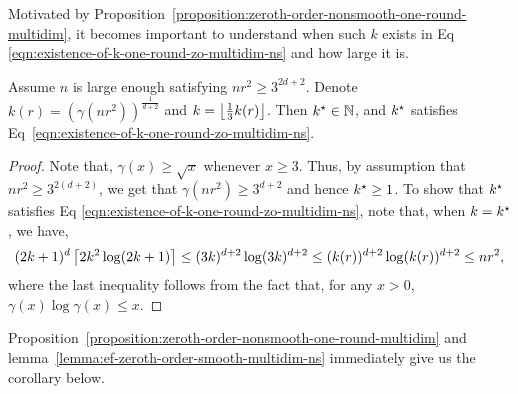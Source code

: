 Motivated by Proposition~\ref{proposition:zeroth-order-nonsmooth-one-round-multidim}, 
it becomes important to understand when such $k$ exists in Eq 
\eqref{eqn:existence-of-k-one-round-zo-multidim-ns} and how large it is. 

\begin{lemma}
\label{lemma:ef-zeroth-order-smooth-multidim-ns}
Assume $n$ is large enough satisfying $nr^2 \geq 3^{2{d+2}}$. 
Denote $k(r)= \left(\gamma\left(nr^2\right)\right)^\frac{1}{d+2}$
and $k = \left\lfloor{\frac{1}{3} k(r)}\right\rfloor$. Then $k^\star\in \mathbb{N}$,
and $k^\star$ satisfies Eq~\eqref{eqn:existence-of-k-one-round-zo-multidim-ns}.
\end{lemma}


\begin{proof}
Note that, $\gamma(x) \geq \sqrt{x}$ whenever $x \geq 3$. 
Thus, by assumption that $nr^2 \geq 3^{2(d+2)}$, we get that $\gamma(nr^2) \geq 3^{{d+2}}$ 
and hence $k^\star \geq 1$. To show that $k^\star$ satisfies Eq 
\eqref{eqn:existence-of-k-one-round-zo-multidim-ns}, note that, when 
$k = k^\star$, we have, 
\begin{equation*}
(2k+1)^d \left\lceil{2k^2 \log(2k+1)}\right\rceil \leq (3k)^{d+2} \log (3k)^{d+2} \leq
	 (k(r))^{d+2} \log (k(r))^{d+2} \leq nr^2,
\end{equation*}
where the last inequality follows from the fact that, for any $x > 0$, 
$\gamma(x) \log \gamma(x) \leq x$.
\end{proof}
Proposition~\ref{proposition:zeroth-order-nonsmooth-one-round-multidim}
and lemma~\ref{lemma:ef-zeroth-order-smooth-multidim-ns} immediately 
give us the corollary below. 

